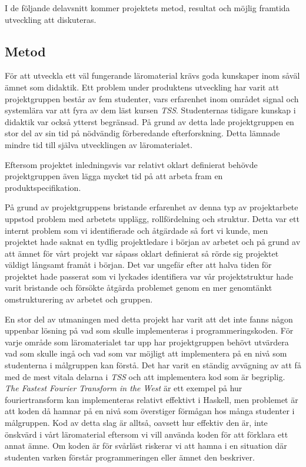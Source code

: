 \documentclass[]{article}
\begin{document}
I de följande delavsnitt kommer projektets metod, resultat och möjlig framtida utveckling att diskuteras.

\subsection{Metod}
För att utveckla ett väl fungerande läromaterial krävs goda kunskaper inom såväl ämnet som didaktik. Ett problem under
produktens utveckling har varit att projektgruppen består av fem studenter, vars erfarenhet inom området signal och
systemlära var att fyra av dem läst kursen \textit{TSS}. Studenternas tidigare kunskap i didaktik var också ytterst
begränsad. På grund av detta lade projektgruppen en stor del av sin tid på nödvändig förberedande efterforskning. Detta
lämnade mindre tid till själva utvecklingen av läromaterialet.

Eftersom projektet inledningsvis var relativt oklart definierat behövde projektgruppen även lägga mycket tid på att
arbeta fram en produktspecifikation.

På grund av projektgruppens bristande erfarenhet av denna typ av projektarbete uppstod problem med arbetets upplägg,
rollfördelning och struktur. Detta var ett internt problem som vi identifierade och åtgärdade så fort vi kunde, men
projektet hade saknat en tydlig projektledare i början av arbetet och på grund av att ämnet för vårt projekt var såpass
oklart definierat så rörde sig projektet väldigt långsamt framåt i början. Det var ungefär efter att halva tiden för
projektet hade passerat som vi lyckades identifiera var vår projektstruktur hade varit bristande och försökte åtgärda
problemet genom en mer genomtänkt omstrukturering av arbetet och gruppen.

En stor del av utmaningen med detta projekt har varit att det inte fanns någon uppenbar lösning på vad som skulle
implementeras i programmeringskoden. För varje område som läromaterialet tar upp har projektgruppen behövt utvärdera
vad som skulle ingå och vad som var möjligt att implementera på en nivå som studenterna i målgruppen kan förstå. Det
har varit en ständig avvägning av att få med de mest vitala delarna i \textit{TSS} och att implementera kod som är
begriplig.  \textit{The Fastest Fourier Transform in the West} %
är ett exempel på hur fouriertransform kan implementeras relativt effektivt i Haskell, men problemet är att koden då
hamnar på en nivå som överstiger förmågan hos många studenter i målgruppen. Kod av detta slag är alltså, oavsett hur
effektiv den är, inte önskvärd i vårt läromaterial eftersom vi vill använda koden för att förklara ett annat ämne. Om
koden är för svårläst riskerar vi att hamna i en situation där studenten varken förstår programmeringen eller ämnet den
beskriver.
\end{document}
